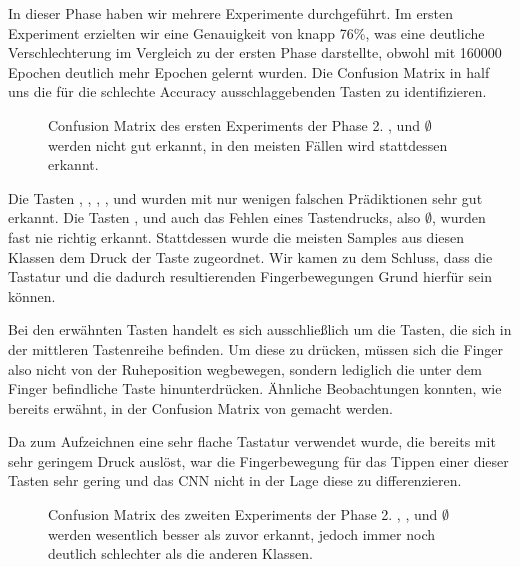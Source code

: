 In dieser Phase haben wir mehrere Experimente durchgeführt.
Im ersten Experiment erzielten wir eine Genauigkeit von knapp 76\%, was eine deutliche Verschlechterung im Vergleich zu der ersten Phase darstellte, obwohl mit \num{160000} Epochen deutlich mehr Epochen gelernt wurden.
Die Confusion Matrix in  half uns die für die schlechte Accuracy ausschlaggebenden Tasten zu identifizieren.

\begin{figure}
    \centering
    
    \caption[Confusion Matrix des ersten Experiments der Phase 2]{Confusion Matrix des ersten Experiments der Phase 2. , \keyboard{\spacebar} und $\emptyset$ werden nicht gut erkannt, in den meisten Fällen wird stattdessen  erkannt\footnotemark.}
\end{figure}

Die Tasten , , , ,  und  wurden mit nur wenigen falschen Prädiktionen sehr gut erkannt.
Die Tasten , \keyboard{\spacebar} und auch das Fehlen eines Tastendrucks, also $\emptyset$, wurden fast nie richtig erkannt. Stattdessen wurde die meisten Samples aus diesen Klassen dem Druck der Taste  zugeordnet.
Wir kamen zu dem Schluss, dass die Tastatur und die dadurch resultierenden Fingerbewegungen Grund hierfür sein können.

Bei den erwähnten Tasten handelt es sich ausschließlich um die Tasten, die sich in der mittleren Tastenreihe befinden. Um diese zu drücken, müssen sich die Finger also nicht von der Ruheposition wegbewegen, sondern lediglich die unter dem Finger befindliche Taste hinunterdrücken. Ähnliche Beobachtungen konnten, wie bereits erwähnt, in der Confusion Matrix von \citet{nasa-joystick-keyboard} gemacht werden.

Da zum Aufzeichnen eine sehr flache Tastatur verwendet wurde, die bereits mit sehr geringem Druck auslöst, war die Fingerbewegung für das Tippen einer dieser Tasten sehr gering und das CNN nicht in der Lage diese zu differenzieren.


\begin{figure}
    \centering
    
    \caption[Confusion Matrix des zweiten Experiments der Phase 2]{Confusion Matrix des zweiten Experiments der Phase 2. , , \keyboard{\spacebar} und $\emptyset$ werden wesentlich besser als zuvor erkannt, jedoch immer noch deutlich schlechter als die anderen Klassen.}
\end{figure}

